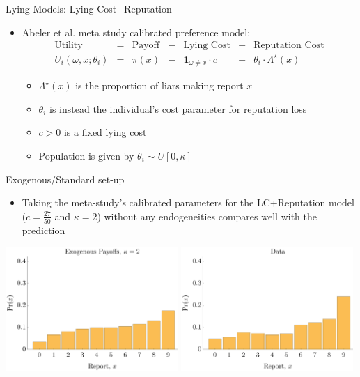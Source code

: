 \documentclass{beamer}
\begin{document}
\begin{frame}{Lying Models: Lying Cost+Reputation}
    \begin{itemize}
        \item Abeler et al. meta study calibrated preference model:
        \[
        \begin{array}{ccccccc}
        \text{Utility} & = & \text{Payoff} & - & \text{Lying Cost} & - & \text{Reputation Cost}\\
        U_{i}(\omega,x;\theta_{i}) & = & \pi(x) & - & \boldsymbol{1}_{\omega\not=x}\cdot c & - & \theta_{i}\cdot\Lambda^{\star}(x)
        \end{array}
        \]
        \begin{itemize}
            \item $\Lambda^{\star}(x)$ is the proportion of liars making report $x$
            \item $\theta_{i}$ is instead the individual's cost parameter for reputation
            loss
            \item $c>0$ is a fixed lying cost
            \item Population is given by $\theta_{i}\sim U[0,\kappa]$
        \end{itemize}
    \end{itemize}
\end{frame}

\begin{frame}{Exogenous/Standard set-up}
    \begin{itemize}
        \item Taking the meta-study's calibrated parameters for the LC+Reputation model ($c=\tfrac{27}{50}$ and $\kappa=2$) without any endogeneities compares well with the prediction
    \end{itemize}
    \begin{center}
    	\includegraphics[width=0.49\textwidth]{./ih/pred_hist_ex_2.pdf}
    	\includegraphics[width=0.49\textwidth]{./ih/emp_hist_ex_nolabel.pdf}
    \end{center}
\end{frame}
\end{document}
